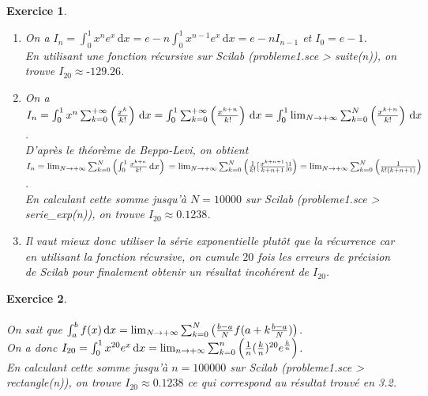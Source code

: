 \documentclass[a4paper,11pt]{article}
\newtheorem{exo}{Exercice}
\begin{document}
\begin{exo} \ \\
\begin{enumerate}
\item On a $ I_n=\int_{0}^{1} x^ne^x \, \mathrm{d}x = e-n\int_{0}^{1} x^{n-1}e^x \, \mathrm{d}x = e-nI_{n-1} $ et $ I_0=e-1 $. \ \\
En utilisant une fonction récursive sur Scilab (probleme1.sce > suite(n)), on trouve $ I_{20}\approx\text{-}129.26 $.
\item On a $ I_n = \int_{0}^{1} x^n\sum_{k=0}^{\text{+}\infty} \left (\frac{x^k}{k!} \right) \, \mathrm{d}x = \int_{0}^{1} \sum_{k=0}^{\text{+}\infty} \left (\frac{x^{k+n}}{k!} \right) \, \mathrm{d}x = \int_{0}^{1} \lim_{N\to\\{\text{+}\infty}}\sum_{k=0}^{N} \left (\frac{x^{k+n}}{k!} \right) \, \mathrm{d}x $. \ \\
D'après le théorème de Beppo-Levi, on obtient $ I_n = \lim_{N\to\\{\text{+}\infty}}\sum_{k=0}^{N} \left(\int_{0}^{1} \frac{x^{k+n}}{k!} \, \mathrm{d}x \right) \newline = \lim_{N\to\\{\text{+}\infty}}\sum_{k=0}^{N} \left(\frac{1}{k!}[\frac{x^{k+n+1}}{k+n+1}]_0^1 \right) = \lim_{N\to\\{\text{+}\infty}}\sum_{k=0}^{N} \left(\frac{1}{k!(k+n+1)} \right) $. \ \\
En calculant cette somme jusqu'à $ N=10000 $ sur Scilab (probleme1.sce > serie\_exp(n)), on trouve $ I_{20}\approx0.1238 $.
\item Il vaut mieux donc utiliser la série exponentielle plutôt que la récurrence car en utilisant la fonction récursive, on cumule $ 20 $ fois les erreurs de précision de Scilab pour finalement obtenir un résultat incohérent de $ I_{20} $.
\end{enumerate}
\end{exo}

\begin{exo} \ \\ \\
On sait que $ \int_{a}^{b} f(x) \, \mathrm{d}x = \lim_{N\to\\{\text{+}\infty}}\sum_{k=0}^{N} \left(\frac{b-a}{N}f(a+k\frac{b-a}{N}) \right) $. \ \\
On a donc $ I_{20} = \int_{0}^{1} x^{20}e^x \, \mathrm{d}x = \lim_{n\to\\{\text{+}\infty}}\sum_{k=0}^{n} \left(\frac{1}{n}(\frac{k}{n})^{20}e^{\frac{k}{n}} \right) $. \ \\
En calculant cette somme jusqu'à $ n=100000 $ sur Scilab (probleme1.sce > rectangle(n)), on trouve $ I_{20}\approx0.1238 $ ce qui correspond au résultat trouvé en 3.2.
\end{exo}
\end{document}
